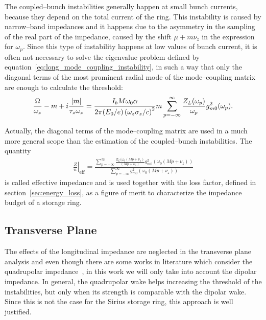     The coupled--bunch instabilities generally happen at small bunch currents, because they depend on the total current of the ring. This instability is caused by narrow--band impedances and it happens due to the asymmetry in the sampling of the real part of the impedance, caused by the shift $\mu + m\nu_z$ in the expression for $\omega_p$. Since this type of instability happens at low values of bunch current, it is often not necessary to solve the eigenvalue problem defined by equation~\eqref{eq:long_mode_coupling_instability}, in such a way that only the diagonal terms of the most prominent radial mode of the mode--coupling matrix are enough to calculate the threshold:
    \begin{align}\label{eq:long_coupled_bunch_instability}
        \frac{\Omega}{\omega_z}-m + i\frac{|m|}{\tau_z\omega_z} = \frac{I_bM\omega_0\alpha}{2\pi(E_0/e)\left(\omega_z\sigma_z/c\right)^2}
             m\sum_{p=-\infty}^{\infty}
                     \frac{Z_L(\omega_p)}{\omega_p} g_{m0}^2(\omega_p).
    \end{align}

    Actually, the diagonal terms of the mode--coupling matrix are used in a much more general scope than the estimation of the coupled--bunch instabilities. The quantity
    \begin{align}
        \left.\frac{Z}{n}\right|_\text{eff} = \frac{\sum\limits_{p=-\infty}^{\infty}
                     \frac{Z_L(\omega_0(Mp+\nu_z)}{(Mp+\nu_z)} g_{m0}^2(\omega_0(Mp+\nu_z))}
                    {\sum\limits_{p=-\infty}^{\infty}g_{m0}^2(\omega_0(Mp+\nu_z))}
    \end{align}
    is called effective impedance and is used together with the loss factor, defined in section~\ref{sec:energy_loss}, as a figure of merit to characterize the impedance budget of a storage ring.

\subsection{Transverse Plane}\label{ssec:transverse_plane}

    The effects of the longitudinal impedance are neglected in the transverse plane analysis and even though there are some works in literature which consider the quadrupolar impedance~\cite{Lindberg2016}, in this work we will only take into account the dipolar impedance. In general, the quadrupolar wake helps increasing the threshold of the instabilities, but only when its strength is comparable with the dipolar wake. Since this is not the case for the Sirius storage ring, this approach is well justified.

